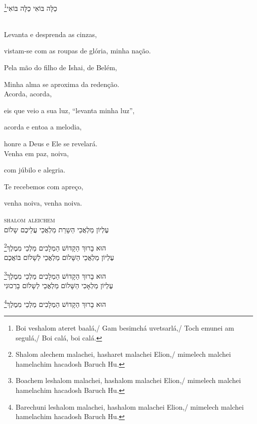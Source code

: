 \footnote{
Boi veshalom ateret baalá,/ Gam besimchá uvetsarlá,/
Toch emunei am segulá,/ Boi calá, boi calá.}כַלָּה בּוֹאִי כַלָּה בּוֹאִי

\movetooddpage
\raggedright

\vspace*{1cm}

\textsc{}\\[15pt]


Levanta e desprenda as cinzas,

vistam-se com as roupas de glória, minha nação.

Pela mão do filho de Ishai, de Belém,

Minha alma se aproxima da redenção.\\[10pt]

Acorda, acorda,

eis que veio a sua luz, ``levanta minha luz'',

acorda e entoa a melodia,

honre a Deus e Ele se revelará.\\[10pt]

Venha em paz, noiva,

com júbilo e alegria.

Te recebemos com apreço,

venha noiva, venha noiva.

\movetoevenpage
\raggedleft
{}

\vspace*{1cm}

\textsc{shalom aleichem}\\[15pt]

עֶלְיוֹן מַלְאֲכֵי הַשָרֵת מַלְאֲכֵי עֲלֵיכֶם שָלוֹם

\footnote{Shalom alechem malachei, hasharet malachei Elion,/
mimelech malchei hamelachim hacadosh Baruch Hu.}הוּא בָרוּךְ הַקָדוֹשׁ הַמְלָכִים מַלְכֵי מִמֶלֶךְ\\[10pt]

עֶלְיוֹן מַלְאֲכֵי הַשָּׁלוֹם מַלְאֲכֵי לְשָׁלוֹם בּוֹאֲכֶם

\footnote{Boachem leshalom malachei, hashalom malachei Elion,/
mimelech malchei hamelachim hacadosh Baruch Hu.}הוּא בָרוּךְ הַקָדוֹשׁ הַמְלָכִים מַלְכֵי מִמֶלֶךְ\\[10pt]

עֶלְיוֹן מַלְאָכִי הַשָּׁלוֹם מַלְאֲכֵי לְשָלוֹם בָרְכוּנִי

\footnote{Barechuni leshalom malachei, hashalom malachei Elion,/
mimelech malchei hamelachim hacadosh Baruch Hu.}הוּא בָרוּךְ הַקָדוֹשׁ הַמְלָכִים מַלְכֵי מִמֶלֶךְ\\[10pt] 

